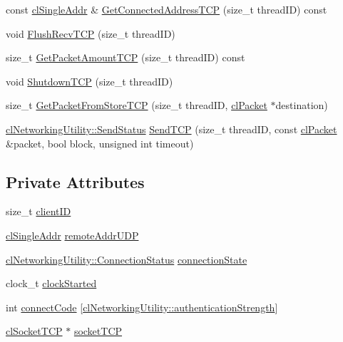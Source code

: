\begin{DoxyCompactItemize}
\item 
const \hyperlink{classcl_single_addr}{clSingleAddr} \& \hyperlink{classcl_s_client_a7e1902d813deb1ef51d68532cd2c6d81}{GetConnectedAddressTCP} (size\_\-t threadID) const 
\item 
void \hyperlink{classcl_s_client_a04890f0214cab7c74873de330317422c}{FlushRecvTCP} (size\_\-t threadID)
\item 
size\_\-t \hyperlink{classcl_s_client_a7a08da8507499aa530a114d88b7e8cdf}{GetPacketAmountTCP} (size\_\-t threadID) const 
\item 
void \hyperlink{classcl_s_client_af2e8e590ab4ca21490b276cda540d263}{ShutdownTCP} (size\_\-t threadID)
\item 
size\_\-t \hyperlink{classcl_s_client_a355e4804063ce95611ffcb6b72dec67b}{GetPacketFromStoreTCP} (size\_\-t threadID, \hyperlink{classcl_packet}{clPacket} $\ast$destination)
\item 
\hyperlink{classcl_networking_utility_a19389cda12603396e03caa9d82073803}{clNetworkingUtility::SendStatus} \hyperlink{classcl_s_client_af7a988045a68ed3e95e56fc1e8a9de0c}{SendTCP} (size\_\-t threadID, const \hyperlink{classcl_packet}{clPacket} \&packet, bool block, unsigned int timeout)
\end{DoxyCompactItemize}
\subsection*{Private Attributes}
\begin{DoxyCompactItemize}
\item 
size\_\-t \hyperlink{classcl_s_client_ac5af0964e2af13aab950694923308512}{clientID}
\item 
\hyperlink{classcl_single_addr}{clSingleAddr} \hyperlink{classcl_s_client_a9caa557830e054fd916506b0b0b009ef}{remoteAddrUDP}
\item 
\hyperlink{classcl_networking_utility_a15dd34683154e07d5843f8f5432fec6d}{clNetworkingUtility::ConnectionStatus} \hyperlink{classcl_s_client_a1c0884f02facf322bc8fb8a1b78a3e5f}{connectionState}
\item 
clock\_\-t \hyperlink{classcl_s_client_a94a58dbecbb367d53535efd533602100}{clockStarted}
\item 
int \hyperlink{classcl_s_client_a051064752aa82c8787204336927897c1}{connectCode} \mbox{[}\hyperlink{classcl_networking_utility_aa48d05605a3161f1b99b1dac14e05774}{clNetworkingUtility::authenticationStrength}\mbox{]}
\item 
\hyperlink{classcl_socket_t_c_p}{clSocketTCP} $\ast$ \hyperlink{classcl_s_client_a7cc5ca2a86b8b3a96884ed174dffb0f3}{socketTCP}
\end{DoxyCompactItemize}


